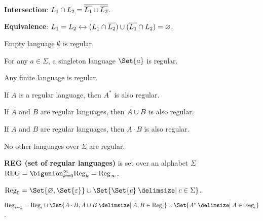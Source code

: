 \documentclass[a4paper,10pt]{article}
\begin{document}
\begin{terms}
\begin{terms}
        \item \textbf{Intersection}: $L_1 \cap L_2 = \overline{\overline{L_1} \cup \overline{L_2}}$.

        \item \textbf{Equivalence}: $L_1 = L_2 \xleftrightarrow{} (L_1 \cap \overline{L_2}) \cup (\overline{L_1} \cap L_2) = \varnothing$.
    \end{terms}


    \begin{terms}
        \item Empty language $\emptyset$ is regular.

        \item For any $a \in \Sigma$, a singleton language $\Set{a}$ is regular.

        \item Any finite language is regular.

        \item If $A$ is a regular language, then $A^*$ is also regular.

        \item If $A$ and $B$ are regular languages, then $A \cup B$ is also regular.

        \item If $A$ and $B$ are regular languages, then $A \cdot B$ is also regular.

        \item No other languages over $\Sigma$ are regular.
    \end{terms}

    \item \textbf{REG (set of regular languages)} is set over an alphabet $\Sigma$\\ $\mathrm{REG} = \bigunion_{k = 0}^{\infty} \mathrm{Reg}_{k} = \mathrm{Reg}_{\infty}$.

    \begin{terms}
        \item $\mathrm{Reg}_{0} = \Set{\emptyset, \Set{\varepsilon}} \union \Set{\Set{c} \given c \in \Sigma}$.

        \item $\mathrm{Reg}_{i + 1} = \mathrm{Reg}_{i} \union \Set{A \cdot B, A \union B \given A,B \in \mathrm{Reg}_{i}} \union \Set{A^* \given A \in \mathrm{Reg}_{i}}$.
    \end{terms}


\end{terms}
\end{document}
